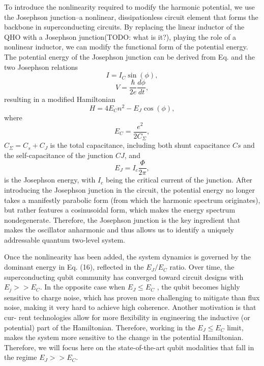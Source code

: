 \documentclass[11pt, oneside]{article}   	%
\begin{document}
To introduce the nonlinearity required to modify the harmonic potential, 
we use the Josephson junction--a nonlinear, dissipationless circuit element that forms the backbone in superconducting circuits. 
By replacing the linear inductor of the QHO with a Josephson junction(TODO: what is it?), playing the role of a nonlinear inductor, 
we can modify the functional form of the potential energy. 
The potential energy of the Josephson junction can be derived from Eq. and the two Josephson relations
\begin{equation*} 
I = I_C \sin(\phi),
\end{equation*}
\begin{equation*} 
V = \frac{\hbar}{2 e} \frac{d \phi}{dt},
\end{equation*}
resulting in a modified Hamiltonian
\begin{equation*} 
H = 4 E_C n^2 - E_J \cos(\phi),
\end{equation*}
where
\begin{equation*} 
E_C = \frac{e^2}{2 C_{\Sigma}},
\end{equation*}
$C_{\Sigma} = C_{s} + C_{J}$ 
is the total capacitance, including both shunt capacitance $Cs$ and the self-capacitance of the junction $CJ$, and 
\begin{equation*} 
E_J = I_c \frac{\Phi}{2 \pi},
\end{equation*}
is the Josephson energy, with $I_c$ being the critical current of the junction.
After introducing the Josephson junction in the circuit, the potential energy no longer takes a manifestly parabolic form (from which the harmonic spectrum originates), but rather features a cosinusoidal form, 
which makes the energy spectrum nondegenerate. 
Therefore, the Josephson junction is the key ingredient that makes the oscillator anharmonic and thus allows us to identify a uniquely addressable quantum two-level system.

Once the nonlinearity has been added, the system dynamics is governed by the dominant energy in Eq. (16), reflected in the 
$E_J/E_C$ ratio. 
Over time, the superconducting qubit community has converged toward circuit designs with 
$E_j >> E_C$. 
In the opposite case when 
$E_J \leq E_C$ , the qubit becomes highly sensitive to charge noise, 
which has proven more challenging to mitigate than flux noise, making it very hard to achieve high coherence. 
Another motivation is that cur- rent technologies allow for more flexibility in engineering the inductive (or potential) part of the Hamiltonian. 
Therefore, working in the $E_J \leq E_C$ limit, makes the system more sensitive to the change in the potential Hamiltonian. 
Therefore, we will focus here on the state-of-the-art qubit modalities that fall in the regime 
$E_J >> E_C$.
\end{document}
